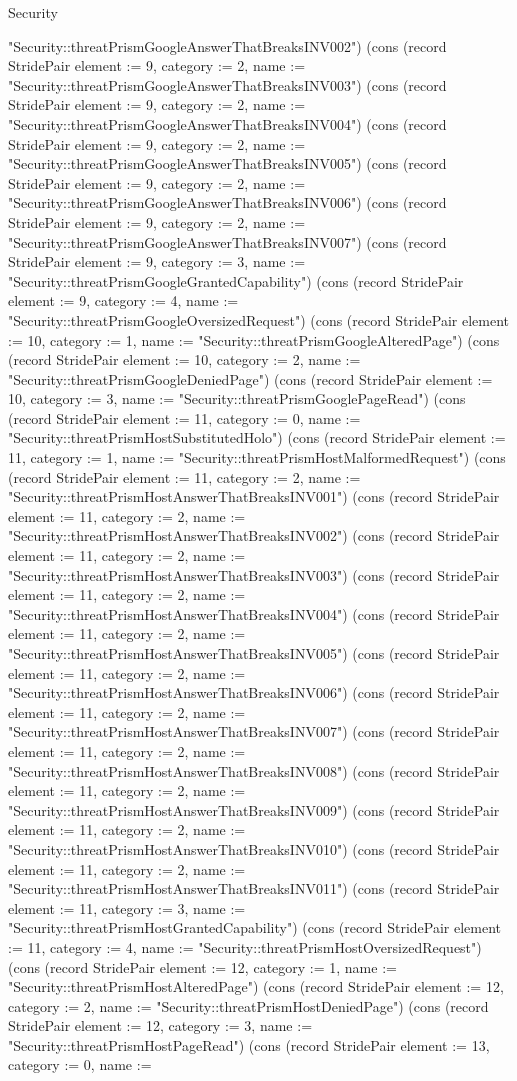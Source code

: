 \begin{lexlean}{Security}
\begin{semanticmodule}
{"Security::threatPrismGoogleAnswerThatBreaksINV002"}) (cons (record StridePair {element := 9, category := 2, name := "Security::threatPrismGoogleAnswerThatBreaksINV003"}) (cons (record StridePair {element := 9, category := 2, name := "Security::threatPrismGoogleAnswerThatBreaksINV004"}) (cons (record StridePair {element := 9, category := 2, name := "Security::threatPrismGoogleAnswerThatBreaksINV005"}) (cons (record StridePair {element := 9, category := 2, name := "Security::threatPrismGoogleAnswerThatBreaksINV006"}) (cons (record StridePair {element := 9, category := 2, name := "Security::threatPrismGoogleAnswerThatBreaksINV007"}) (cons (record StridePair {element := 9, category := 3, name := "Security::threatPrismGoogleGrantedCapability"}) (cons (record StridePair {element := 9, category := 4, name := "Security::threatPrismGoogleOversizedRequest"}) (cons (record StridePair {element := 10, category := 1, name := "Security::threatPrismGoogleAlteredPage"}) (cons (record StridePair {element := 10, category := 2, name := "Security::threatPrismGoogleDeniedPage"}) (cons (record StridePair {element := 10, category := 3, name := "Security::threatPrismGooglePageRead"}) (cons (record StridePair {element := 11, category := 0, name := "Security::threatPrismHostSubstitutedHolo"}) (cons (record StridePair {element := 11, category := 1, name := "Security::threatPrismHostMalformedRequest"}) (cons (record StridePair {element := 11, category := 2, name := "Security::threatPrismHostAnswerThatBreaksINV001"}) (cons (record StridePair {element := 11, category := 2, name := "Security::threatPrismHostAnswerThatBreaksINV002"}) (cons (record StridePair {element := 11, category := 2, name := "Security::threatPrismHostAnswerThatBreaksINV003"}) (cons (record StridePair {element := 11, category := 2, name := "Security::threatPrismHostAnswerThatBreaksINV004"}) (cons (record StridePair {element := 11, category := 2, name := "Security::threatPrismHostAnswerThatBreaksINV005"}) (cons (record StridePair {element := 11, category := 2, name := "Security::threatPrismHostAnswerThatBreaksINV006"}) (cons (record StridePair {element := 11, category := 2, name := "Security::threatPrismHostAnswerThatBreaksINV007"}) (cons (record StridePair {element := 11, category := 2, name := "Security::threatPrismHostAnswerThatBreaksINV008"}) (cons (record StridePair {element := 11, category := 2, name := "Security::threatPrismHostAnswerThatBreaksINV009"}) (cons (record StridePair {element := 11, category := 2, name := "Security::threatPrismHostAnswerThatBreaksINV010"}) (cons (record StridePair {element := 11, category := 2, name := "Security::threatPrismHostAnswerThatBreaksINV011"}) (cons (record StridePair {element := 11, category := 3, name := "Security::threatPrismHostGrantedCapability"}) (cons (record StridePair {element := 11, category := 4, name := "Security::threatPrismHostOversizedRequest"}) (cons (record StridePair {element := 12, category := 1, name := "Security::threatPrismHostAlteredPage"}) (cons (record StridePair {element := 12, category := 2, name := "Security::threatPrismHostDeniedPage"}) (cons (record StridePair {element := 12, category := 3, name := "Security::threatPrismHostPageRead"}) (cons (record StridePair {element := 13, category := 0, name := }
\end{semanticmodule}
\end{lexlean}
